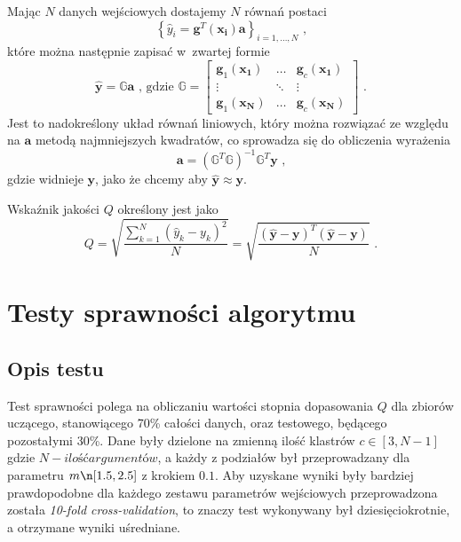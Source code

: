 \documentclass[a4paper; 11pt]{article}
\begin{document}
Mając $N$ danych wejściowych dostajemy $N$ równań postaci
\begin{equation}
    \left\{ \hat{y}_i = \mathbf{g}^T(\mathbf{x_i}) \mathbf{a} \right\} _ {i = 1, \dots , N} \text{ ,}
    \label{eq:ts:yhateqs}
\end{equation}
które można następnie zapisać w~zwartej formie
\begin{equation}
    \hat{\mathbf{y}} = \mathbb{G} \mathbf{a} \text{ , gdzie }
    \mathbb{G} = \begin{bmatrix}
        \mathbf{g}_1(\mathbf{x_1}) & \dots & \mathbf{g}_c(\mathbf{x_1}) \\
        \vdots & \ddots & \vdots \\
        \mathbf{g}_1(\mathbf{x_N}) & \dots & \mathbf{g}_c(\mathbf{x_N})
    \end{bmatrix} \text{ .}
    \label{eq:ts:yhatmatrix}
\end{equation}
Jest to nadokreślony układ równań liniowych, który można rozwiązać ze względu
na $\mathbf{a}$ metodą najmniejszych kwadratów, co sprowadza się do obliczenia
wyrażenia
\begin{equation}
    \mathbf{a} = \left( \mathbb{G}^T \mathbb{G} \right)^{-1} \mathbb{G}^T \mathbf{y} \text{ ,}
    \label{eq:ts:a}
\end{equation}
gdzie widnieje $\mathbf{y}$, jako że chcemy aby $\hat{\mathbf{y}} \approx \mathbf{y}$.

Wskaźnik jakości $Q$ określony jest jako
\begin{equation}
    Q = \sqrt{ \frac{ \sum\limits_{k=1}^N {\left( \hat{y}_k - y_k \right)^2} }{N} }
    = \sqrt { \frac{ (\hat{\mathbf{y}} - \mathbf{y})^T (\hat{\mathbf{y}} - \mathbf{y}) }{N} } \text{ .}
    \label{eq:ts:Q}
\end{equation}

\section{Testy sprawności algorytmu}

\subsection{Opis testu}
Test sprawności polega na obliczaniu wartości stopnia dopasowania $Q$ dla zbiorów uczącego,
stanowiącego 70\% całości danych, oraz testowego, będącego pozostałymi 30\%. Dane były dzielone
na zmienną ilość klastrów $c \in [3,N-1]$ gdzie $N - ilość argumentów$, a każdy z podziałów
był przeprowadzany dla parametru $m \n [1.5, 2.5]$ z krokiem $0.1$. Aby uzyskane wyniki były
bardziej prawdopodobne dla każdego zestawu parametrów wejściowych przeprowadzona została
\emph{10-fold cross-validation}, to znaczy test wykonywany był dziesięciokrotnie, a otrzymane
wyniki uśredniane.
\end{document}
